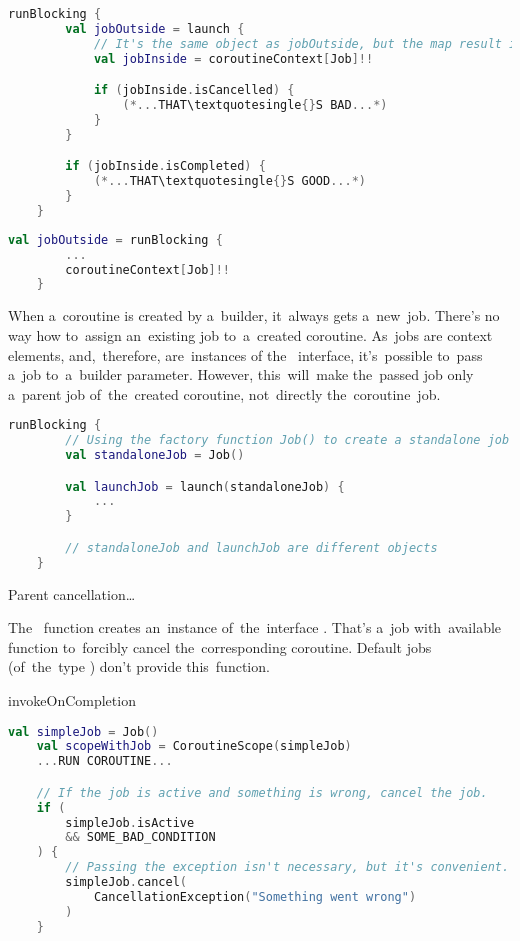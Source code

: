 \begin{lstlisting}[language=Kotlin]
    runBlocking {
        val jobOutside = launch {
            // It's the same object as jobOutside, but the map result is nullable
            val jobInside = coroutineContext[Job]!!

            if (jobInside.isCancelled) {
                (*...THAT\textquotesingle{}S BAD...*)
            }
        }

        if (jobInside.isCompleted) {
            (*...THAT\textquotesingle{}S GOOD...*)
        }
    }
\end{lstlisting}

\begin{lstlisting}[language=Kotlin]
    val jobOutside = runBlocking {
        ...
        coroutineContext[Job]!!
    }
\end{lstlisting}

\warning When a~coroutine is created by a~builder, it~always gets a~new~job.
There's no way how to~assign an~existing job to~a~created coroutine.
As~jobs are context elements, and,~therefore, are~instances of the~ interface, it's~possible to~pass a~job to~a~builder parameter.
However, this~will~make the~passed job only a~parent job of~the~created coroutine, not~directly the~coroutine~job.

\begin{lstlisting}[language=Kotlin]
    runBlocking {
        // Using the factory function Job() to create a standalone job
        val standaloneJob = Job()

        val launchJob = launch(standaloneJob) {
            ...
        }

        // standaloneJob and launchJob are different objects
    }
\end{lstlisting}

\warning Parent cancellation\ldots

\note The~ function creates an~instance of~the~interface .
That's a~job with~available function  to~forcibly cancel the~corresponding coroutine.
Default jobs (of~the~type ) don't provide this~function.

\todo invokeOnCompletion

\begin{lstlisting}[language=Kotlin]
    val simpleJob = Job()
    val scopeWithJob = CoroutineScope(simpleJob)
    ...RUN COROUTINE...

    // If the job is active and something is wrong, cancel the job.
    if (
        simpleJob.isActive
        && SOME_BAD_CONDITION
    ) {
        // Passing the exception isn't necessary, but it's convenient.
        simpleJob.cancel(
            CancellationException("Something went wrong")
        )
    }
\end{lstlisting}

\label{kotlincoroutinedispatcher}
